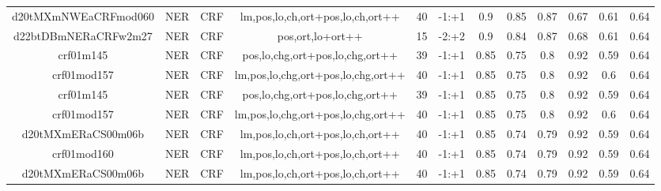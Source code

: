 \documentclass[a4paper]{article}
\begin{document}
\begin{landscape}
\begin{center}
\begin{tabular}{ |c|c|c|c|c|c|c|c|c|c|c|c|}
 	
 		
 		\small{ d20tMXmNWEaCRFmod060 } & NER & CRF & lm,pos,lo,ch,ort+pos,lo,ch,ort++  &  40 &  -1:+1  &  0.9 & 0.85 & 0.87  &  0.67 & 0.61 & 0.64 \\
 		

 	
 
 	
 		
 		\small{ d22btDBmNERaCRFw2m27 } & NER & CRF & pos,ort,lo+ort++  &  15 &  -2:+2  &  0.9 & 0.84 & 0.87  &  0.68 & 0.61 & 0.64 \\
 		

 	
 
 	
 		
 		\small{ crf01m145 } & NER & CRF & pos,lo,chg,ort+pos,lo,chg,ort++  &  39 &  -1:+1  &  0.85 & 0.75 & 0.8  &  0.92 & 0.59 & 0.64 \\
 		

 	
 
 	
 		
 		\small{ crf01mod157 } & NER & CRF & lm,pos,lo,chg,ort+pos,lo,chg,ort++  &  40 &  -1:+1  &  0.85 & 0.75 & 0.8  &  0.92 & 0.6 & 0.64 \\
 		

 	
 
 	
 		
 		\small{ crf01m145 } & NER & CRF & pos,lo,chg,ort+pos,lo,chg,ort++  &  39 &  -1:+1  &  0.85 & 0.75 & 0.8  &  0.92 & 0.59 & 0.64 \\
 		

 	
 
 	
 		
 		\small{ crf01mod157 } & NER & CRF & lm,pos,lo,chg,ort+pos,lo,chg,ort++  &  40 &  -1:+1  &  0.85 & 0.75 & 0.8  &  0.92 & 0.6 & 0.64 \\
 		

 	
 
 	
 		
 		\small{ d20tMXmERaCS00m06b } & NER & CRF & lm,pos,lo,ch,ort+pos,lo,ch,ort++  &  40 &  -1:+1  &  0.85 & 0.74 & 0.79  &  0.92 & 0.59 & 0.64 \\
 		

 	
 
 	
 		
 		\small{ crf01mod160 } & NER & CRF & lm,pos,lo,ch,ort+pos,lo,ch,ort++  &  40 &  -1:+1  &  0.85 & 0.74 & 0.79  &  0.92 & 0.59 & 0.64 \\
 		

 	
 
 	
 		
 		\small{ d20tMXmERaCS00m06b } & NER & CRF & lm,pos,lo,ch,ort+pos,lo,ch,ort++  &  40 &  -1:+1  &  0.85 & 0.74 & 0.79  &  0.92 & 0.59 & 0.64 \\
 		


\end{tabular}
\end{center}
\end{landscape}
\end{document}
